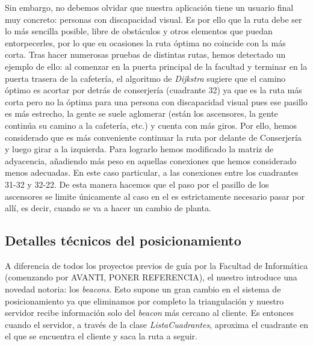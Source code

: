 Sin embargo, no debemos olvidar que nuestra aplicación tiene un usuario final muy concreto: personas con discapacidad visual. Es por ello que la ruta debe ser lo más sencilla posible, libre de obstáculos y otros elementos que puedan entorpecerles, por lo que en ocasiones la ruta óptima no coincide con la más corta. Tras hacer numerosas pruebas de distintas rutas, hemos detectado un ejemplo de ello: al comenzar en la puerta principal de la facultad y terminar en la puerta trasera de la cafetería, el algoritmo de \textit{Dijkstra} sugiere que el camino óptimo es acortar por detrás de conserjería (cuadrante 32) ya que es la ruta más corta pero no la óptima para una persona con discapacidad visual pues ese pasillo es más estrecho, la gente se suele aglomerar (están los ascensores, la gente continúa su camino a la cafetería, etc.) y cuenta con más giros. Por ello, hemos considerado que es más conveniente continuar la ruta por delante de Conserjería y luego girar a la izquierda. Para lograrlo hemos modificado la matriz de adyacencia, añadiendo más peso en aquellas conexiones que hemos considerado menos adecuadas. En este caso particular, a las conexiones entre los cuadrantes 31-32 y 32-22. De esta manera hacemos que el paso por el pasillo de los ascensores se limite únicamente al caso en el es estrictamente necesario pasar por allí, es decir, cuando se va a hacer un cambio de planta.


\subsection{Detalles técnicos del posicionamiento}

A diferencia de todos los proyectos previos de guía por la Facultad de Informática (comenzando por AVANTI, PONER REFERENCIA), el nuestro introduce una novedad notoria: los \textit{beacons}. Esto supone un gran cambio en el sistema de posicionamiento ya que eliminamos por completo la triangulación y nuestro servidor recibe información solo del \textit{beacon} más cercano al cliente. Es entonces cuando el servidor, a través de la clase \textit{ListaCuadrantes}, aproxima el cuadrante en el que se encuentra el cliente y saca la ruta a seguir.  %


